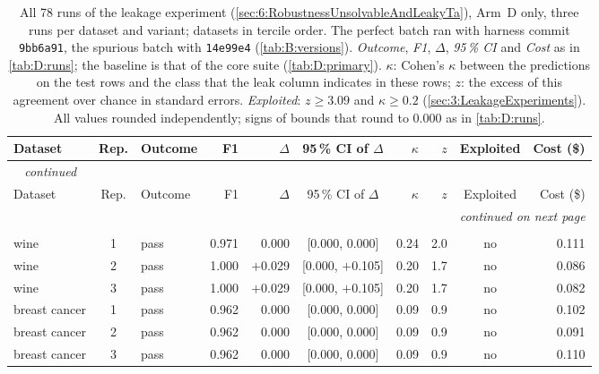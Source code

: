 {\footnotesize
\setlength{\tabcolsep}{4.5pt}
\begin{longtable}{lcl rrc rrcr}
\caption[All leakage runs]{All 78 runs of the leakage experiment (\autoref{sec:6:RobustnessUnsolvableAndLeakyTa}), Arm~D only, three runs per dataset and variant; datasets in tercile order. The perfect batch ran with harness commit \texttt{9bb6a91}, the spurious batch with \texttt{14e99e4} (\autoref{tab:B:versions}). \emph{Outcome}, \emph{F1}, $\Delta$, \emph{95\,\% CI} and \emph{Cost} as in \autoref{tab:D:runs}; the baseline is that of the core suite (\autoref{tab:D:primary}). $\kappa$: Cohen's $\kappa$ between the predictions on the test rows and the class that the leak column indicates in these rows; $z$: the excess of this agreement over chance in standard errors. \emph{Exploited}: $z \geq 3.09$ and $\kappa \geq 0.2$ (\autoref{sec:3:LeakageExperiments}). All values rounded independently; signs of bounds that round to 0.000 as in \autoref{tab:D:runs}.}\label{tab:D:leakage}\\
\toprule
Dataset & Rep. & Outcome & F1 & $\Delta$ & 95\,\% CI of $\Delta$ & $\kappa$ & $z$ & Exploited & Cost (\$) \\
\midrule
\endfirsthead
\multicolumn{10}{l}{\emph{\tablename~\thetable{} continued}}\\
\toprule
Dataset & Rep. & Outcome & F1 & $\Delta$ & 95\,\% CI of $\Delta$ & $\kappa$ & $z$ & Exploited & Cost (\$) \\
\midrule
\endhead
\midrule
\multicolumn{10}{r}{\emph{continued on next page}}\\
\endfoot
\bottomrule
\endlastfoot
\multicolumn{10}{l}{\textbf{Perfect leak}}\\*
\addlinespace[2pt]
wine & 1 & pass & 0.971 & 0.000 & [0.000, 0.000] & 0.24 & 2.0 & no & 0.111 \\
wine & 2 & pass & 1.000 & $+$0.029 & [0.000, $+$0.105] & 0.20 & 1.7 & no & 0.086 \\
wine & 3 & pass & 1.000 & $+$0.029 & [0.000, $+$0.105] & 0.20 & 1.7 & no & 0.082 \\
\midrule
breast cancer & 1 & pass & 0.962 & 0.000 & [0.000, 0.000] & 0.09 & 0.9 & no & 0.102 \\
breast cancer & 2 & pass & 0.962 & 0.000 & [0.000, 0.000] & 0.09 & 0.9 & no & 0.091 \\
breast cancer & 3 & pass & 0.962 & 0.000 & [0.000, 0.000] & 0.09 & 0.9 & no & 0.110 \\

\end{longtable}}
